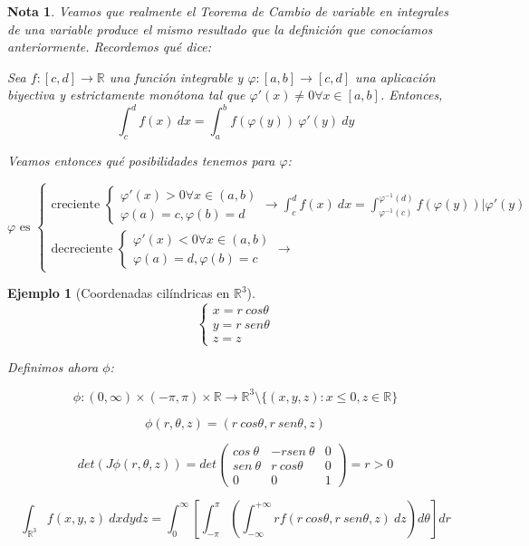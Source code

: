 \documentclass[11pt, a4paper]{article}
\newif\IfInSansMode
\newcommand{\R}{\mathbb{R}} \newcommand{\N}{\mathbb{N}}
\theoremstyle{theorem-style}
\theoremstyle{definition-style}
\theoremstyle{remark-style}
\newtheorem*{nota}{Nota}
\theoremstyle{example-style}
\newtheorem{ejemplo}{Ejemplo}[section]
\begin{document}
\begin{nota} %
 Veamos que realmente el Teorema de Cambio de variable en integrales de una
 variable produce el mismo resultado que la definición que conocíamos
 anteriormente. Recordemos qué dice:

 Sea $f: [c, d] \rightarrow \R$ una función integrable y $\varphi: [a, b]
\rightarrow [c, d]$ una aplicación biyectiva y estrictamente monótona tal que $\varphi'(x) \neq 0 \forall
x \in [a, b]$. Entonces,
$$\int_c^df(x) \ dx = \int_a^bf(\varphi(y)) \ \varphi'(y)
\ dy$$

Veamos entonces qué posibilidades tenemos para $\varphi$:

$$ \varphi \text{ es }
\begin{cases}
  \text{creciente }
  \begin{cases}
    \varphi'(x) > 0 \forall x \in (a,b) \\
    \varphi(a) = c, \varphi(b) = d
  \end{cases}
  \rightarrow \int_c^d f(x) \ dx = \int_{\varphi^{-1}(c)}^{\varphi^{-1}(d)}
  f(\varphi(y)) |\varphi'(y) \\
  \text{decreciente }
  \begin{cases}
    \varphi'(x) < 0 \forall x \in (a,b) \\
    \varphi(a) = d, \varphi(b) = c
  \end{cases}
  \rightarrow
\end{cases}$$

\end{nota}


\begin{ejemplo}[Coordenadas cilíndricas en $\R^3$]
  $$
\begin{cases}
  x = r \ cos \theta \\
  y = r \ sen \theta \\
  z = z
\end{cases}
$$

Definimos ahora $\phi$:

$$\phi : (0, \infty) \times (-\pi, \pi) \times \R \rightarrow \R^3 \setminus
\{(x,y,z) : x \leq 0, z \in \R \}$$

$$\phi(r, \theta, z) = (r \ cos \theta, r \ sen \theta, z)$$

$$det(J \phi (r, \theta, z)) = det
\begin{pmatrix}
  cos \ \theta & -rsen \ \theta & 0 \\
  sen \ \theta & r \ cos \theta & 0 \\
  0 & 0 & 1
\end{pmatrix} = r > 0$$

$$\int_{\R^3}f(x,y,z) \ dxdydz = \int_0^{\infty} \left[ \int_{-\pi}^{\pi} \left(
  \int_{-\infty}^{+\infty}rf(r \ cos \theta, r \ sen \theta, z) \ dz \right) d
\theta \right]dr$$
\end{ejemplo}
\end{document}
